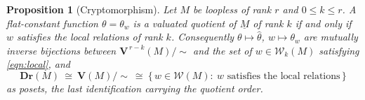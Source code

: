 \documentclass{article}
\newtheorem{proposition}[theorem]{Proposition}
\theoremstyle{definition}
\newcommand{\Dr}{\mathbf{Dr}}
\newcommand{\bV}{\mathbf V}
\newcommand{\cW}{\mathcal{W}}
\begin{document}
\begin{proposition}[Cryptomorphism]\label{prop:crypto}
Let $M$ be loopless of rank $r$ and $0\le k\le r$. A flat-constant function $\theta=\theta_w$ is a
valuated quotient of $\underline M$ of rank $k$ if and only if $w$ satisfies the local relations of
rank $k$. Consequently $\theta\mapsto\widehat\theta$, $w\mapsto\theta_w$ are mutually inverse
bijections between $\bV^{\,r-k}(M)/\!\sim$ and the set of $w\in\cW_k(M)$ satisfying
\eqref{eqn:local}, and
\begin{equation}\label{eqn:identification}
  \Dr(M)\ \cong\ \bV(M)/\!\sim\ \cong\ \{\,w\in\cW(M):\ w\text{ satisfies the local relations}\,\}
\end{equation}
as posets, the last identification carrying the quotient order.
\end{proposition}
\end{document}
